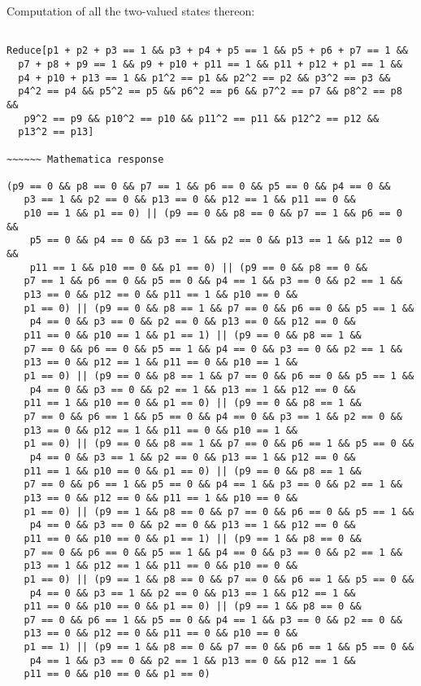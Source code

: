 \documentclass[%
  twocolumn,
 showpacs,
 showkeys,
 preprintnumbers,
 amsmath,amssymb,
 aps,
  pra,
  longbibliography,
 floatfix,
 ]{revtex4-1}
\begin{document}
Computation of all the two-valued states thereon:


{ \begin{lstlisting}[backgroundcolor=\color{yellow!10},framerule=0pt,breaklines=true, frame=tb]

Reduce[p1 + p2 + p3 == 1 && p3 + p4 + p5 == 1 && p5 + p6 + p7 == 1 &&
  p7 + p8 + p9 == 1 && p9 + p10 + p11 == 1 && p11 + p12 + p1 == 1 &&
  p4 + p10 + p13 == 1 && p1^2 == p1 && p2^2 == p2 && p3^2 == p3 &&
  p4^2 == p4 && p5^2 == p5 && p6^2 == p6 && p7^2 == p7 && p8^2 == p8 &&
   p9^2 == p9 && p10^2 == p10 && p11^2 == p11 && p12^2 == p12 &&
  p13^2 == p13]

~~~~~~ Mathematica response

(p9 == 0 && p8 == 0 && p7 == 1 && p6 == 0 && p5 == 0 && p4 == 0 &&
   p3 == 1 && p2 == 0 && p13 == 0 && p12 == 1 && p11 == 0 &&
   p10 == 1 && p1 == 0) || (p9 == 0 && p8 == 0 && p7 == 1 && p6 == 0 &&
    p5 == 0 && p4 == 0 && p3 == 1 && p2 == 0 && p13 == 1 && p12 == 0 &&
    p11 == 1 && p10 == 0 && p1 == 0) || (p9 == 0 && p8 == 0 &&
   p7 == 1 && p6 == 0 && p5 == 0 && p4 == 1 && p3 == 0 && p2 == 1 &&
   p13 == 0 && p12 == 0 && p11 == 1 && p10 == 0 &&
   p1 == 0) || (p9 == 0 && p8 == 1 && p7 == 0 && p6 == 0 && p5 == 1 &&
    p4 == 0 && p3 == 0 && p2 == 0 && p13 == 0 && p12 == 0 &&
   p11 == 0 && p10 == 1 && p1 == 1) || (p9 == 0 && p8 == 1 &&
   p7 == 0 && p6 == 0 && p5 == 1 && p4 == 0 && p3 == 0 && p2 == 1 &&
   p13 == 0 && p12 == 1 && p11 == 0 && p10 == 1 &&
   p1 == 0) || (p9 == 0 && p8 == 1 && p7 == 0 && p6 == 0 && p5 == 1 &&
    p4 == 0 && p3 == 0 && p2 == 1 && p13 == 1 && p12 == 0 &&
   p11 == 1 && p10 == 0 && p1 == 0) || (p9 == 0 && p8 == 1 &&
   p7 == 0 && p6 == 1 && p5 == 0 && p4 == 0 && p3 == 1 && p2 == 0 &&
   p13 == 0 && p12 == 1 && p11 == 0 && p10 == 1 &&
   p1 == 0) || (p9 == 0 && p8 == 1 && p7 == 0 && p6 == 1 && p5 == 0 &&
    p4 == 0 && p3 == 1 && p2 == 0 && p13 == 1 && p12 == 0 &&
   p11 == 1 && p10 == 0 && p1 == 0) || (p9 == 0 && p8 == 1 &&
   p7 == 0 && p6 == 1 && p5 == 0 && p4 == 1 && p3 == 0 && p2 == 1 &&
   p13 == 0 && p12 == 0 && p11 == 1 && p10 == 0 &&
   p1 == 0) || (p9 == 1 && p8 == 0 && p7 == 0 && p6 == 0 && p5 == 1 &&
    p4 == 0 && p3 == 0 && p2 == 0 && p13 == 1 && p12 == 0 &&
   p11 == 0 && p10 == 0 && p1 == 1) || (p9 == 1 && p8 == 0 &&
   p7 == 0 && p6 == 0 && p5 == 1 && p4 == 0 && p3 == 0 && p2 == 1 &&
   p13 == 1 && p12 == 1 && p11 == 0 && p10 == 0 &&
   p1 == 0) || (p9 == 1 && p8 == 0 && p7 == 0 && p6 == 1 && p5 == 0 &&
    p4 == 0 && p3 == 1 && p2 == 0 && p13 == 1 && p12 == 1 &&
   p11 == 0 && p10 == 0 && p1 == 0) || (p9 == 1 && p8 == 0 &&
   p7 == 0 && p6 == 1 && p5 == 0 && p4 == 1 && p3 == 0 && p2 == 0 &&
   p13 == 0 && p12 == 0 && p11 == 0 && p10 == 0 &&
   p1 == 1) || (p9 == 1 && p8 == 0 && p7 == 0 && p6 == 1 && p5 == 0 &&
    p4 == 1 && p3 == 0 && p2 == 1 && p13 == 0 && p12 == 1 &&
   p11 == 0 && p10 == 0 && p1 == 0)

\end{lstlisting}  }
\end{document}
